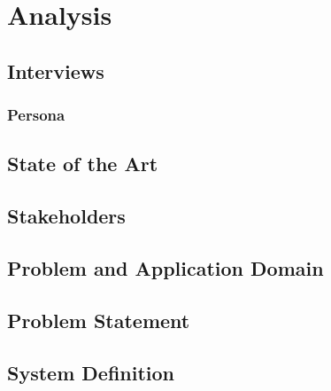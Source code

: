 \chapter{Analysis}


\section{Interviews}





\subsection{Persona}


\section{State of the Art}


\section{Stakeholders}


\section{Problem and Application Domain}


\section{Problem Statement}


\section{System Definition}

